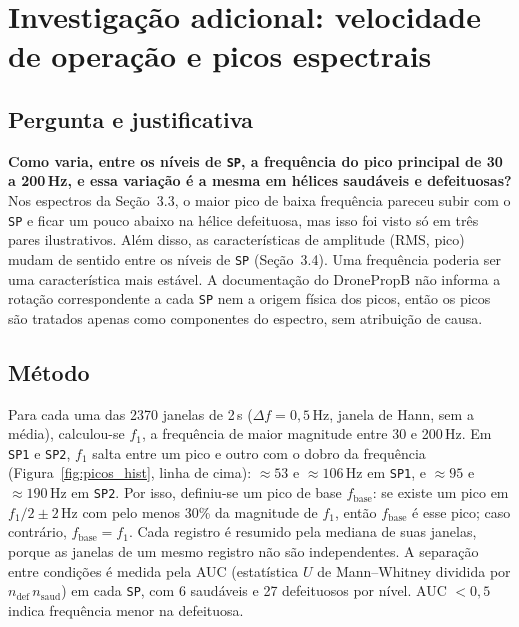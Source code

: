 
\section{Investigação adicional: velocidade de operação e picos espectrais}
\label{sec:investigacao}

\subsection*{Pergunta e justificativa}

\textbf{Como varia, entre os níveis de \texttt{SP}, a frequência do pico principal de 30 a 200\,Hz, e essa variação é a mesma em hélices saudáveis e defeituosas?}
Nos espectros da Seção~3.3, o maior pico de baixa frequência pareceu subir com o \texttt{SP} e ficar um pouco abaixo na hélice defeituosa, mas isso foi visto só em três pares ilustrativos.
Além disso, as características de amplitude (RMS, pico) mudam de sentido entre os níveis de \texttt{SP} (Seção~3.4).
Uma frequência poderia ser uma característica mais estável.
A documentação do DronePropB não informa a rotação correspondente a cada \texttt{SP} nem a origem física dos picos, então os picos são tratados apenas como componentes do espectro, sem atribuição de causa.

\subsection*{Método}

Para cada uma das 2370 janelas de 2\,s ($\Delta f = 0{,}5$\,Hz, janela de Hann, sem a média), calculou-se $f_1$, a frequência de maior magnitude entre 30 e 200\,Hz.
Em \texttt{SP1} e \texttt{SP2}, $f_1$ salta entre um pico e outro com o dobro da frequência (Figura~\ref{fig:picos_hist}, linha de cima): $\approx 53$ e $\approx 106$\,Hz em \texttt{SP1}, e $\approx 95$ e $\approx 190$\,Hz em \texttt{SP2}.
Por isso, definiu-se um pico de base $f_\text{base}$: se existe um pico em $f_1/2 \pm 2$\,Hz com pelo menos 30\% da magnitude de $f_1$, então $f_\text{base}$ é esse pico; caso contrário, $f_\text{base} = f_1$.
Cada registro é resumido pela mediana de suas janelas, porque as janelas de um mesmo registro não são independentes.
A separação entre condições é medida pela AUC (estatística $U$ de Mann--Whitney dividida por $n_\text{def}\,n_\text{saud}$) em cada \texttt{SP}, com 6 saudáveis e 27 defeituosos por nível.
AUC $< 0{,}5$ indica frequência menor na defeituosa.

